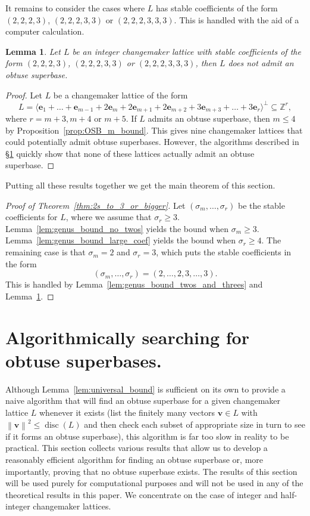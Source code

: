 \documentclass{amsart} %
\newcommand{\Z}{\mathbb{Z}}
\newcommand{\e}{\bm{e}}
\newcommand{\bv}{\bm{v}}
\newcommand{\norm}[1]{\left\lVert #1 \right\rVert^2}
\theoremstyle{thm}
\newtheorem{lem}[Theorem]{Lemma}
\theoremstyle{definition}
\numberwithin{equation}{section}
\begin{document}
It remains to consider the cases where $L$ has stable coefficients of the form $(2,2,2,3)$, $(2,2,2,3,3)$ or $(2,2,2,3,3,3)$. This is handled with the aid of a computer calculation.
\begin{lem}\label{lem:small_genus_bound_case}
    Let $L$ be an integer changemaker lattice with stable coefficients of the form $(2,2,2,3)$, $(2,2,2,3,3)$ or $(2,2,2,3,3,3)$, then $L$ does not admit an obtuse superbase.
\end{lem}
\begin{proof}
Let $L$ be a changemaker lattice of the form
\[
L=\langle \e_1+ \dots+\e_{m-1} +2\e_m + 2\e_{m+1} + 2\e_{m+2}+3\e_{m+3}+\dots + 3 \e_r\rangle^\bot\subseteq \Z^r,
\]
where $r=m+3, m+4$ or $m+5$. If $L$ admits an obtuse superbase, then $m\leq 4$ by Proposition~\ref{prop:OSB_m_bound}. This gives nine changemaker lattices that could potentially admit obtuse superbases. However, the algorithms described in \S\ref{sec:OSB_search} quickly show that none of these lattices actually admit an obtuse superbase. 
\end{proof}

Putting all these results together we get the main theorem of this section.
\begin{proof}[Proof of Theorem~\ref{thm:2s_to_3_or_bigger}]
Let $(\sigma_m,\dots, \sigma_r)$ be the stable coefficients for $L$, where we assume that $\sigma_r\geq 3$.
Lemma~\ref{lem:genus_bound_no_twos} yields the bound when $\sigma_m\geq 3$. Lemma~\ref{lem:genus_bound_large_coef} yields the bound when $\sigma_r\geq 4$. The remaining case is that $\sigma_m=2$ and $\sigma_r=3$, which puts the stable coefficients in the form
\[(\sigma_m,\dots, \sigma_r)=(2,\dots,2,3,\dots,3).\]
This is handled by Lemma~\ref{lem:genus_bound_twos_and_threes} and Lemma~\ref{lem:small_genus_bound_case}.
\end{proof}

\section{Algorithmically searching for obtuse superbases.}\label{sec:OSB_search}
Although Lemma~\ref{lem:universal_bound} is sufficient on its own to provide a naive algorithm that will find an obtuse superbase for a given changemaker lattice $L$ whenever it exists (list the finitely many vectors $\bv\in L$ with $\norm{\bv}\leq \operatorname{disc}(L)$ and then check each subset of appropriate size in turn to see if it forms an obtuse superbase), this algorithm is far too slow in reality to be practical. This section collects various results that allow us to develop a reasonably efficient algorithm for finding an obtuse superbase or, more importantly, proving that no obtuse superbase exists. The results of this section will be used purely for computational purposes and will not be used in any of the theoretical results in this paper. We concentrate on the case of integer and half-integer changemaker lattices.
\end{document}
